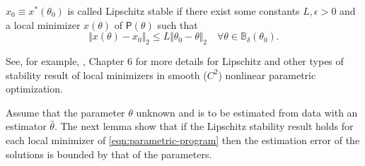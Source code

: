 \begin{definition}
$x_0 \equiv x^*(\theta_0)$ is called Lipschitz stable if there exist some constants $L, \epsilon > 0$ and a local minimizer $x(\theta)$ of $\mathsf{P}(\theta)$ such that
\[
\Vert x(\theta) - {x_0} \Vert_2 \leq L \Vert \theta_0 - {\theta} \Vert_2 \quad \forall \theta \in \mathbb{B}_{\delta}({\theta_0}). 
\]
\end{definition}

See, for example, \cite{still2018lectures}, Chapter 6 for more details for Lipschitz and other types of stability result of local minimizers in smooth ($C^2$) nonlinear parametric optimization.

Assume that the parameter $\theta$ unknown and is to be estimated from data with an estimator $\widehat{\theta}$. The next lemma show that if the Lipschitz stability result holds for each local minimizer of \ref{eqn:parametric-program} then the estimation error of the solutions is bounded by that of the parameters.

